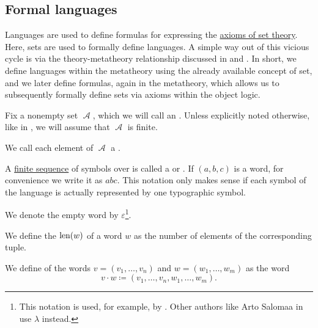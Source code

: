 \subsection{Formal languages}\label{subsec:formal_languages}

Languages are used to define formulas for expressing the \hyperref[def:zfc]{axioms of set theory}. Here, sets are used to formally define languages. A simple way out of this vicious cycle is via the theory-metatheory relationship discussed in  and . In short, we define languages within the metatheory using the already available concept of set, and we later define formulas, again in the metatheory, which allows us to subsequently formally define sets via axioms within the object logic.

\begin{definition}\label{def:formal_language}
  Fix a nonempty set \( \mscrA \), which we will call an . Unless explicitly noted otherwise, like in , we will assume that \( \mscrA \) is finite.

  \begin{thmenum}
     We call each element of \( \mscrA \) a .

     A \hyperref[def:sequence]{finite sequence} of symbols over is called a  or . If \( (a, b, c) \) is a word, for convenience we write it as \( abc \). This notation only makes sense if each symbol of the language is actually represented by one typographic symbol.

     We denote the empty word by \( \varepsilon \)\footnote{This notation is used, for example, by \cite[9]{Savage1998}. Other authors like Arto Salomaa in \cite[3]{Salomaa1987} use \( \lambda \) instead.}.

     We define the  \( \operatorname{len}(w) \) of a word \( w \) as the number of elements of the corresponding tuple.

     We define  of the words \( v = (v_1, \ldots, v_n) \) and \( w = (w_1, \ldots, w_m) \) as the word
    \begin{equation*}
      v \cdot w \coloneqq (v_1, \ldots, v_n, w_1, \ldots, w_m).
    \end{equation*}


\end{thmenum}
\end{definition}
